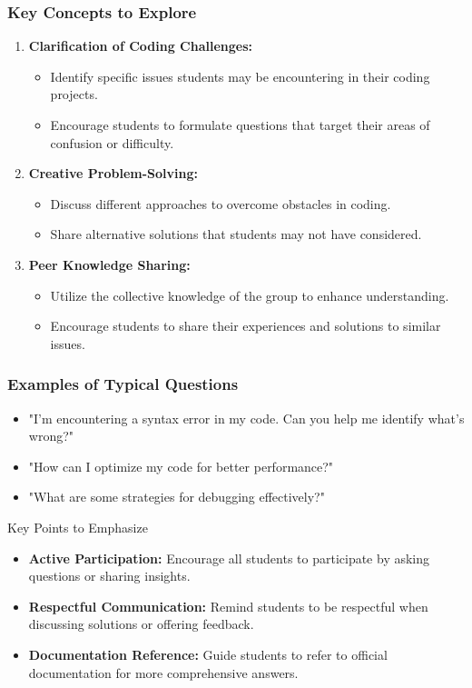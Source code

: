 \documentclass[aspectratio=169]{beamer}
\begin{document}
\begin{frame}
    \frametitle{Key Concepts to Explore}
    \begin{enumerate}
        \item \textbf{Clarification of Coding Challenges:}
            \begin{itemize}
                \item Identify specific issues students may be encountering in their coding projects.
                \item Encourage students to formulate questions that target their areas of confusion or difficulty.
            \end{itemize}
        
        \item \textbf{Creative Problem-Solving:}
            \begin{itemize}
                \item Discuss different approaches to overcome obstacles in coding.
                \item Share alternative solutions that students may not have considered.
            \end{itemize}
        
        \item \textbf{Peer Knowledge Sharing:}
            \begin{itemize}
                \item Utilize the collective knowledge of the group to enhance understanding.
                \item Encourage students to share their experiences and solutions to similar issues.
            \end{itemize}
    \end{enumerate}
\end{frame}

\begin{frame}
    \frametitle{Examples of Typical Questions}
    \begin{itemize}
        \item "I'm encountering a syntax error in my code. Can you help me identify what's wrong?"
        \item "How can I optimize my code for better performance?"
        \item "What are some strategies for debugging effectively?"
    \end{itemize}

    \begin{block}{Key Points to Emphasize}
        \begin{itemize}
            \item \textbf{Active Participation:} Encourage all students to participate by asking questions or sharing insights.
            \item \textbf{Respectful Communication:} Remind students to be respectful when discussing solutions or offering feedback.
            \item \textbf{Documentation Reference:} Guide students to refer to official documentation for more comprehensive answers.
        \end{itemize}
    \end{block}
\end{frame}
\end{document}
